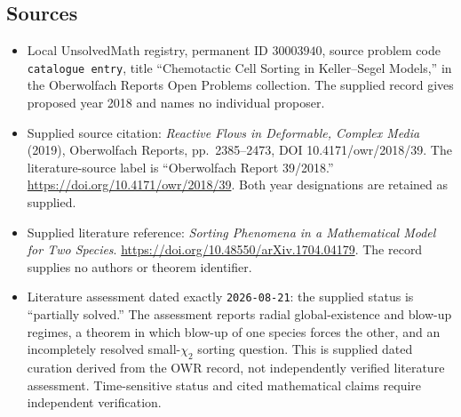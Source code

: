 \documentclass[11pt]{article}
\begin{document}
\subsection{Sources}
\begin{itemize}
\item Local UnsolvedMath registry, permanent ID \(30003940\), source problem code \texttt{catalogue entry}, title ``Chemotactic Cell Sorting in Keller--Segel Models,'' in the Oberwolfach Reports Open Problems collection. The supplied record gives proposed year 2018 and names no individual proposer.
\item Supplied source citation: \emph{Reactive Flows in Deformable, Complex Media} (2019), Oberwolfach Reports, pp.\ 2385--2473, DOI 10.4171/owr/2018/39. The literature-source label is ``Oberwolfach Report 39/2018.'' \url{https://doi.org/10.4171/owr/2018/39}. Both year designations are retained as supplied.
\item Supplied literature reference: \emph{Sorting Phenomena in a Mathematical Model for Two Species}. \url{https://doi.org/10.48550/arXiv.1704.04179}. The record supplies no authors or theorem identifier.
\item Literature assessment dated exactly \texttt{2026-08-21}: the supplied status is ``partially solved.'' The assessment reports radial global-existence and blow-up regimes, a theorem in which blow-up of one species forces the other, and an incompletely resolved small-\(\chi_2\) sorting question. This is supplied dated curation derived from the OWR record, not independently verified literature assessment. Time-sensitive status and cited mathematical claims require independent verification.
\end{itemize}
\end{document}
